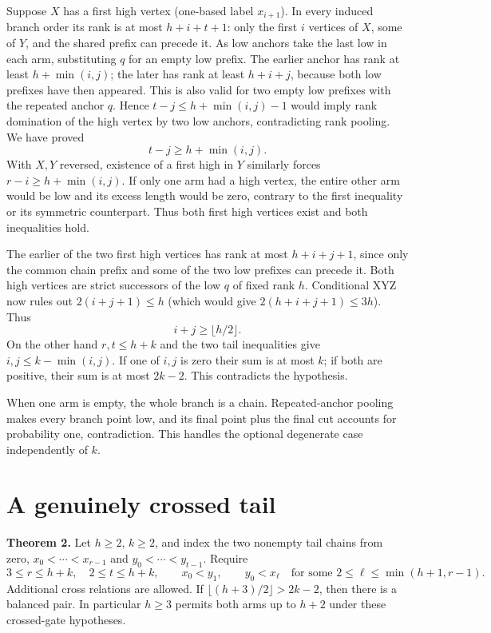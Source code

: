 \documentclass[10pt,letterpaper]{article}
\begin{document}
Suppose \(X\) has a first high vertex (one-based label \(x_{i+1}\)). In
every induced branch order its rank is at most \(h+i+t+1\): only the
first \(i\) vertices of \(X\), some of \(Y\), and the shared prefix can
precede it. As low anchors take the last low in each arm, substituting
\(q\) for an empty low prefix. The earlier anchor has rank at least
\(h+\min(i,j)\); the later has rank at least \(h+i+j\), because both low
prefixes have then appeared. This is also valid for two empty low
prefixes with the repeated anchor \(q\). Hence \(t-j\le h+\min(i,j)-1\)
would imply rank domination of the high vertex by two low anchors,
contradicting rank pooling. We have proved \[
    t-j\ge h+\min(i,j).
\] With \(X,Y\) reversed, existence of a first high in \(Y\) similarly
forces \(r-i\ge h+\min(i,j)\). If only one arm had a high vertex, the
entire other arm would be low and its excess length would be zero,
contrary to the first inequality or its symmetric counterpart. Thus both
first high vertices exist and both inequalities hold.

The earlier of the two first high vertices has rank at most \(h+i+j+1\),
since only the common chain prefix and some of the two low prefixes can
precede it. Both high vertices are strict successors of the low \(q\) of
fixed rank \(h\). Conditional XYZ now rules out \(2(i+j+1)\le h\) (which
would give \(2(h+i+j+1)\le3h\)). Thus \[
    i+j\ge\lfloor h/2\rfloor.
\] On the other hand \(r,t\le h+k\) and the two tail inequalities give
\(i,j\le k-\min(i,j)\). If one of \(i,j\) is zero their sum is at most
\(k\); if both are positive, their sum is at most \(2k-2\). This
contradicts the hypothesis.

When one arm is empty, the whole branch is a chain. Repeated-anchor
pooling makes every branch point low, and its final point plus the final
cut accounts for probability one, contradiction. This handles the
optional degenerate case independently of \(k\).

\section{A genuinely crossed tail}\label{a-genuinely-crossed-tail}

\textbf{Theorem 2.} Let \(h\ge2\), \(k\ge2\), and index the two nonempty
tail chains from zero, \(x_0<\cdots<x_{r-1}\) and
\(y_0<\cdots<y_{t-1}\). Require \[
    3\le r\le h+k,\quad 2\le t\le h+k,\qquad x_0<y_1,\qquad y_0<x_\ell
    \quad\text{for some }2\le\ell\le\min(h+1,r-1).
\] Additional cross relations are allowed. If
\(\lfloor(h+3)/2\rfloor>2k-2\), then there is a balanced pair. In
particular \(h\ge3\) permits both arms up to \(h+2\) under these
crossed-gate hypotheses.
\end{document}
